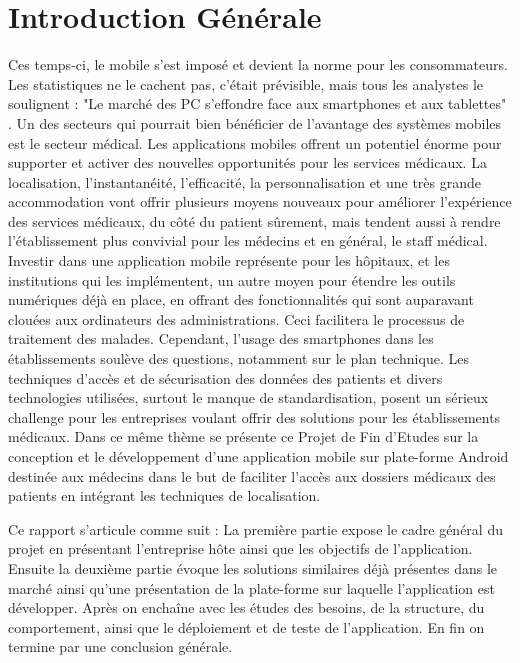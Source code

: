 
\chapter{Introduction Générale}

Ces temps-ci, le mobile s’est imposé et devient la norme pour les consommateurs.
Les statistiques ne le cachent pas, c’était prévisible, mais tous les analystes
le soulignent : "Le marché des PC s’effondre face aux smartphones et aux
tablettes" \cite{venturebeat.com}. Un des secteurs qui pourrait bien bénéficier
de l’avantage des systèmes mobiles est le secteur médical. Les applications
mobiles offrent un potentiel énorme pour supporter et activer des nouvelles
opportunités pour les services médicaux. La localisation, l’instantanéité,
l’efficacité, la personnalisation et une très grande accommodation vont offrir
plusieurs moyens nouveaux pour améliorer l’expérience des services médicaux, du
côté du patient sûrement, mais tendent aussi à rendre l’établissement plus
convivial pour les médecins et en général, le staff médical. Investir dans une
application mobile représente pour les hôpitaux, et les institutions qui les
implémentent, un autre moyen pour étendre les outils numériques déjà en place,
en offrant des fonctionnalités qui sont auparavant clouées  aux ordinateurs des
administrations. Ceci facilitera le processus de traitement des malades.
Cependant, l’usage des smartphones dans les établissements soulève des
questions, notamment sur le plan technique. Les techniques d’accès et de
sécurisation des données des patients et divers technologies utilisées, surtout
le manque de standardisation, posent un sérieux challenge pour les entreprises
voulant offrir des solutions pour les établissements médicaux. Dans ce même
thème se présente ce Projet de Fin d’Etudes sur la conception et le
développement d’une application mobile sur plate-forme Android destinée aux
médecins dans le but de faciliter l’accès aux dossiers médicaux des patients en
intégrant les techniques de localisation.

Ce rapport s'articule comme suit : La première partie expose le cadre
général du projet en présentant l’entreprise hôte ainsi que les objectifs de
l’application. Ensuite la deuxième partie évoque les solutions similaires déjà présentes
dans le marché ainsi qu’une présentation de la plate-forme sur laquelle
l’application est développer. Après on enchaîne avec les études des besoins, de la structure, du comportement, ainsi que le déploiement et de teste de l'application. En fin on termine par une conclusion générale.
